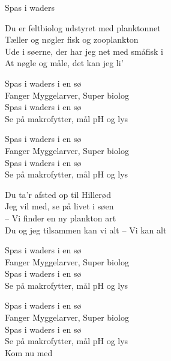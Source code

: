 \begin{song}{Spas i waders}
  \begin{SBVerse}
Du er feltbiolog udstyret med planktonnet\\
Tæller og nøgler fisk og zooplankton\\
Ude i søerne, der har jeg net med småfisk i\\
At nøgle og måle, det kan jeg li'
  \end{SBVerse}

  \begin{SBChorus}
Spas i waders i en sø\\
Fanger Myggelarver, Super biolog\\
Spas i waders i en sø\\
Se på makrofytter, mål pH og lys
  \end{SBChorus}

  \begin{SBChorus}
Spas i waders i en sø\\
Fanger Myggelarver, Super biolog\\
Spas i waders i en sø\\
Se på makrofytter, mål pH og lys
  \end{SBChorus}



  \begin{SBSection*}
Du ta'r afsted op til Hillerød\\
Jeg vil med, se på livet i søen\\
 -- Vi finder en ny plankton art\\
Du og jeg tilsammen kan vi alt
 -- Vi kan alt
  \end{SBSection*}

  \begin{SBChorus}
Spas i waders i en sø\\
Fanger Myggelarver, Super biolog\\
Spas i waders i en sø\\
Se på makrofytter, mål pH og lys\
  \end{SBChorus}

  \begin{SBChorus}
Spas i waders i en sø\\
Fanger Myggelarver, Super biolog\\
Spas i waders i en sø\\
Se på makrofytter, mål pH og lys\\
Kom nu med
  \end{SBChorus}


\end{song}